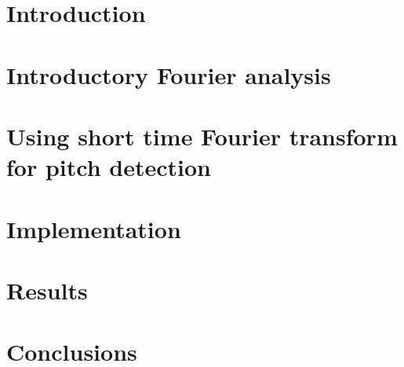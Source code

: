 \documentclass[a4paper,12pt]{article}
\begin{document}

\renewcommand{\cftsecfont}{\fontfamily{comfortaa}\selectfont}

\renewcommand{\cftsubsecfont}{\fontfamily{comfortaa}\selectfont}
\renewcommand{\cftsubsubsecfont}{\fontfamily{comfortaa}\selectfont}
\renewcommand{\contentsname}{\fontfamily{comfortaa}\selectfont Table of Contents}






\setcounter{tocdepth}{2}
\tableofcontents    
\newpage 


\section{Introduction}
 

\section{Introductory Fourier analysis}
 


\section{ Using short time Fourier transform for pitch detection}

\section{Implementation}

\section{Results}


\section{Conclusions}




\end{document}

